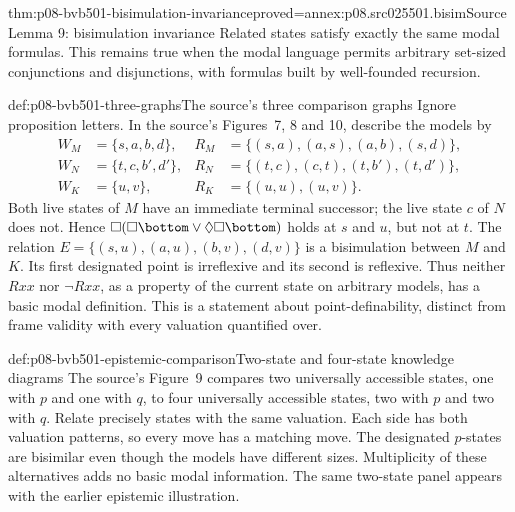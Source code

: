 \begin{hbtheorem}{thm:p08-bvb501-bisimulation-invariance}{proved=annex:p08.src025501.bisim}{Source Lemma 9: bisimulation invariance}
Related states satisfy exactly the same modal formulas. This remains true
when the modal language permits arbitrary set-sized conjunctions and
disjunctions, with formulas built by well-founded recursion.
\end{hbtheorem}

\begin{hbexample}{def:p08-bvb501-three-graphs}{The source's three comparison graphs}
Ignore proposition letters. In the source's Figures~7, 8 and 10, describe the models by
\[
\begin{aligned}
 W_M&=\{s,a,b,d\},&R_M&=\{(s,a),(a,s),(a,b),(s,d)\},\\
 W_N&=\{t,c,b',d'\},&R_N&=\{(t,c),(c,t),(t,b'),(t,d')\},\\
 W_K&=\{u,v\},&R_K&=\{(u,u),(u,v)\}.
\end{aligned}
\]
Both live states of \(M\) have an immediate terminal successor; the
live state \(c\) of \(N\) does not. Hence
\(\Box(\Box\bottom\lor\Diamond\Box\bottom)\) holds at \(s\)
and \(u\), but not at \(t\). The relation
\(E=\{(s,u),(a,u),(b,v),(d,v)\}\) is a bisimulation between
\(M\) and \(K\). Its first designated point is irreflexive and its
second is reflexive. Thus neither \(Rxx\) nor \(\neg Rxx\), as a
property of the current state on arbitrary models, has a basic modal
definition. This is a statement about point-definability, distinct from
frame validity with every valuation quantified over.
\end{hbexample}

\begin{hbexample}{def:p08-bvb501-epistemic-comparison}{Two-state and four-state knowledge diagrams}
The source's Figure~9 compares two universally accessible states, one with
\(p\) and one with \(q\), to four universally accessible states, two
with \(p\) and two with \(q\). Relate precisely states with the same
valuation. Each side has both valuation patterns, so every move has a
matching move. The designated \(p\)-states are bisimilar even though the
models have different sizes. Multiplicity of these alternatives adds no
basic modal information. The same two-state panel appears with the earlier
epistemic illustration.
\end{hbexample}


